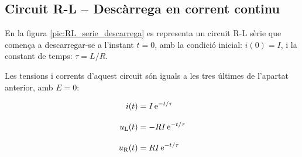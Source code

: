 \subsection{Circuit R-L -- Descàrrega en corrent continu}\label{sec:RL-descarrega}

En la figura \vref{pic:RL_serie_descarrega} es representa un circuit R-L sèrie que comença a descarregar-se a l'instant $t=0$, amb la condició inicial: $i(0) = I$, i la constant de temps: $\tau = L/R$.
\begin{center}
    
    \label{pic:RL_serie_descarrega}
\end{center}

\vspace{5mm}
Les tensions i corrents d'aquest circuit són iguals a les tres últimes de l'apartat anterior, amb $E=0$:

\hfill
\begin{minipage}[b]{9cm}
    
\end{minipage}
\hfill
\begin{minipage}[b]{6cm}
    \begin{align}
        i(t) &= I\,\mathrm{e}^{-t/\tau} \label{eq:RL-i-descarrega}\\[3mm]
        u_\mathrm{L}(t) &= - R I\,\mathrm{e}^{-t/\tau}\label{eq:RL-ul-descarrega} \\[3mm]
        u_\mathrm{R}(t) &= R I\,\mathrm{e}^{-t/\tau}
    \end{align}
\end{minipage}

